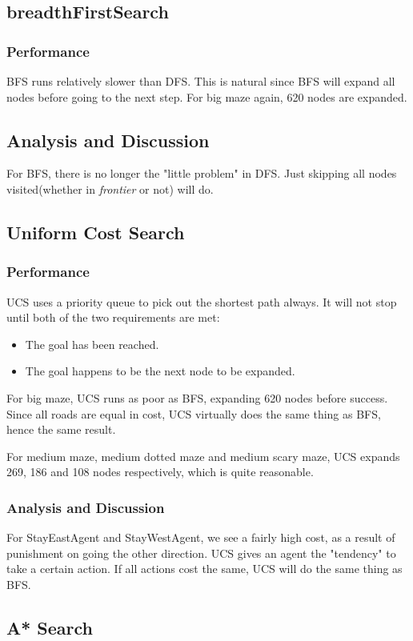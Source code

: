 \documentclass{article}
\begin{document}
  \subsection{breadthFirstSearch}
    \subsubsection{Performance}
    BFS runs relatively slower than DFS. This is natural since BFS will expand all nodes before going to the next step. For big maze again, 620 nodes are expanded.
    \subsection{Analysis and Discussion}
    For BFS, there is no longer the "little problem" in DFS. Just skipping all nodes visited(whether in \textit{frontier} or not) will do.
  \subsection{Uniform Cost Search}
    \subsubsection{Performance}
    UCS uses a priority queue to pick out the shortest path always. It will not stop until both of the two requirements are met:
    \begin{itemize}
      \item The goal has been reached.
      \item The goal happens to be the next node to be expanded.
    \end{itemize}\par
    For big maze, UCS runs as poor as BFS, expanding 620 nodes before success. Since all roads are equal in cost, UCS virtually does the same thing as BFS, hence the same result.\par
    For medium maze, medium dotted maze and medium scary maze, UCS expands 269, 186 and 108 nodes respectively, which is quite reasonable.
    \subsubsection{Analysis and Discussion}
    For StayEastAgent and StayWestAgent, we see a fairly high cost, as a result of punishment on going the other direction. UCS gives an agent the "tendency" to take a certain action. If all actions cost the same, UCS will do the same thing as BFS.
  \subsection{A* Search}
\end{document}
